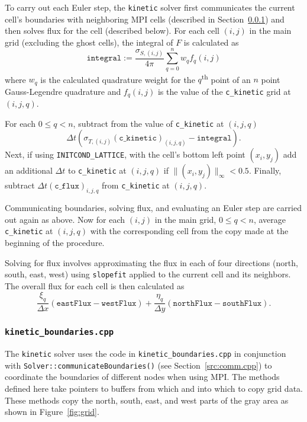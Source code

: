 \documentclass{article}
\newcommand{\assign}{\ensuremath{\mathrel{\texttt{:=}}}}
\newcommand{\kinetic}{\texttt{kinetic}\xspace}
\begin{document}
To carry out each Euler step, the \kinetic solver first communicates the current cell's
boundaries with neighboring MPI cells (described in
Section~\ref{src:kinetic_boundaries.cpp}) and then solves flux for the
cell (described below). For each cell $(i,j)$ in the main grid (excluding the ghost
cells), the integral of $F$ is calculated as
\begin{equation}
    \texttt{integral} \assign
    \frac{\sigma_{S,(i,j)}}{4\pi} \sum_{q=0}^n w_q f_q(i,j)
\end{equation}
where $w_q$ is the calculated quadrature weight for the $q$\textsuperscript{th} point
of an $n$ point Gauss-Legendre quadrature and
$f_q(i,j)$ is the value of the \texttt{c\_kinetic} grid at $(i,j,q)$.

For each $0 \leq q < n$, subtract from the value of \texttt{c\_kinetic} at $(i,j,q)$
\begin{equation} %
    \Delta t \left(\sigma_{T,(i,j)} (\mathtt{c\_kinetic})_{(i,j,q)} -
    \mathtt{integral}\right).
\end{equation}
Next, if using \texttt{INITCOND\_LATTICE}, with the cell's bottom left point
$(x_i,y_j)$ add an additional $\Delta t$ to \texttt{c\_kinetic} at $(i,j,q)$ if
$\|(x_i,y_j)\|_\infty < 0.5$. Finally, subtract $\Delta t (\mathtt{c\_flux})_{i,j,q}$
from \texttt{c\_kinetic} at $(i,j,q)$.

Communicating boundaries, solving flux, and evaluating an Euler step are carried out
again as above. Now for each $(i,j)$ in the main grid, $0 \leq q < n$, average
\texttt{c\_kinetic} at $(i,j,q)$ with the corresponding cell from the copy made at
the beginning of the procedure.

Solving for flux involves approximating the flux in each of four directions
(north, south, east, west) using
\texttt{slopefit} applied to the current cell and its neighbors. The overall flux for
each cell is then calculated as
\begin{equation}
    \frac{\xi_q}{\Delta x} (\mathtt{eastFlux} - \mathtt{westFlux}) +
    \frac{\eta_q}{\Delta y} (\mathtt{northFlux} - \mathtt{southFlux}).
\end{equation}

\subsubsection{\texttt{kinetic\_boundaries.cpp}}
\label{src:kinetic_boundaries.cpp}
The \kinetic solver uses the code in \texttt{kinetic\_boundaries.cpp} in
conjunction with \texttt{Solver::communicateBoundaries()}
(see Section~\ref{src:comm.cpp}) to coordinate the boundaries of different nodes
when using MPI.
The methods defined here take pointers to buffers from which and into which to copy
grid data. These methods copy the north, south, east, and west parts of the gray
area as shown in Figure~\ref{fig:grid}.
\end{document}
